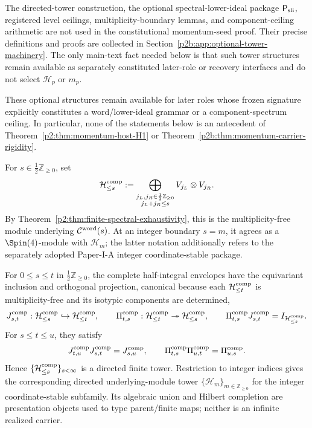 \documentclass[11pt,a4paper]{article}
\begin{document}
\begin{remark}
\label{p2b:rem:optional-tower-machinery-deferred}
The directed-tower construction, the optional spectral-lower-ideal package
\(\mathsf P_{\rm sli}\), registered level ceilings, multiplicity-boundary
lemmas, and component-ceiling arithmetic are not used in the constitutional
momentum-seed proof.  Their precise definitions and proofs are collected in
Section~\ref{p2b:app:optional-tower-machinery}.  The only main-text fact
needed below is that such tower structures remain available as separately
constituted later-role or recovery interfaces and do not select
\(\mathcal H_p\) or \(m_p\).
\end{remark}
These optional structures remain available for later roles whose frozen
signature explicitly constitutes
a word/lower-ideal grammar or a component-spectrum ceiling.  In particular,
none of the statements below is an antecedent of
Theorem~\ref{p2:thm:momentum-host-H1} or
Theorem~\ref{p2b:thm:momentum-carrier-rigidity}.

\begin{definition}
\label{p2:def:half-integral-complete-envelope}
For \(s\in\tfrac12\mathbb Z_{\ge0}\), set
\[
 \mathcal H_{\le s}^{\rm comp}
 :=\bigoplus_{\substack{j_L,j_R\in\frac12\mathbb Z_{\ge0}\\
                        j_L+j_R\le s}}
       V_{j_L}\otimes V_{j_R}.
\]
By Theorem~\ref{p2:thm:finite-spectral-exhaustivity}, this is the
multiplicity-free module underlying \(\mathcal C^{\rm word}(s)\).  At an
integer boundary \(s=m\), it agrees as a \(\Spin(4)\)-module with
\(\mathcal H_m\); the latter notation additionally refers to the separately
adopted Paper-I-A integer coordinate-stable package.
\end{definition}

\begin{proposition}
\label{p2:prop:directed-finite-tower}
For \(0\le s\le t\) in \(\tfrac12\mathbb Z_{\ge0}\), the complete
half-integral envelopes have the equivariant inclusion and orthogonal
projection, canonical because each \(\mathcal H_{\le t}^{\rm comp}\) is
multiplicity-free and its isotypic
components are determined,
\[
 J^{\rm comp}_{s,t}:\mathcal H_{\le s}^{\rm comp}
   \hookrightarrow\mathcal H_{\le t}^{\rm comp},
 \qquad
 \Pi^{\rm comp}_{t,s}:\mathcal H_{\le t}^{\rm comp}
   \twoheadrightarrow\mathcal H_{\le s}^{\rm comp},
 \qquad
 \Pi^{\rm comp}_{t,s}J^{\rm comp}_{s,t}
   =I_{\mathcal H_{\le s}^{\rm comp}}.
\]
For \(s\le t\le u\), they satisfy
\[
 J^{\rm comp}_{t,u}J^{\rm comp}_{s,t}=J^{\rm comp}_{s,u},
 \qquad
 \Pi^{\rm comp}_{t,s}\Pi^{\rm comp}_{u,t}=\Pi^{\rm comp}_{u,s}.
\]
Hence \(\{\mathcal H_{\le s}^{\rm comp}\}_{s<\infty}\) is a directed
finite tower.  Restriction to integer indices gives the corresponding
directed underlying-module tower \(\{\mathcal H_m\}_{m\in\mathbb Z_{\ge0}}\)
for the integer coordinate-stable subfamily.
Its algebraic union and Hilbert completion are presentation objects used to
type parent/finite maps; neither is an infinite realized carrier.
\end{proposition}
\end{document}
